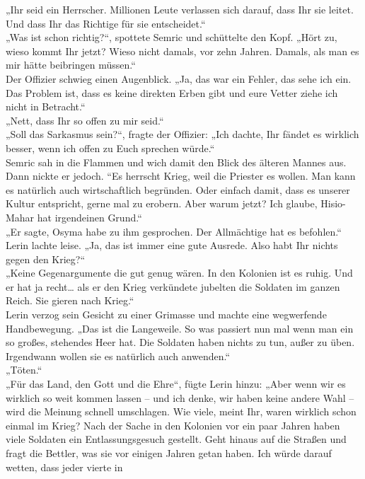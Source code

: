 „Ihr seid ein Herrscher. Millionen Leute verlassen sich darauf, dass Ihr sie leitet. Und dass Ihr 
das Richtige für sie entscheidet.“\\
„Was ist schon richtig?“, spottete Semric und schüttelte den Kopf. „Hört zu, wieso kommt Ihr jetzt? 
Wieso nicht damals, vor zehn Jahren. Damals, als man es mir hätte beibringen müssen.“\\
Der Offizier schwieg einen Augenblick. „Ja, das war ein Fehler, das sehe ich ein. Das Problem ist, 
dass es keine direkten Erben gibt und eure Vetter ziehe ich nicht in Betracht.“\\
„Nett, dass Ihr so offen zu mir seid.“\\
„Soll das Sarkasmus sein?“, fragte der Offizier: „Ich dachte, Ihr fändet es wirklich besser, wenn 
ich offen zu Euch sprechen würde.“\\
Semric sah in die Flammen und wich damit den Blick des älteren Mannes aus. Dann nickte er jedoch. 
``Es herrscht Krieg, weil die Priester es wollen. Man kann es natürlich auch wirtschaftlich 
begründen. Oder einfach damit, dass es unserer Kultur entspricht, gerne mal zu erobern. Aber warum 
jetzt? Ich glaube, Hisio-Mahar hat irgendeinen Grund.“\\
„Er sagte, Osyma habe zu ihm gesprochen. Der Allmächtige hat es befohlen.“\\
Lerin lachte leise. „Ja, das ist immer eine gute Ausrede. Also habt Ihr nichts gegen den Krieg?“\\
„Keine Gegenargumente die gut genug wären. In den Kolonien ist es ruhig. Und er hat ja recht… als er 
den Krieg verkündete jubelten die Soldaten im ganzen Reich. Sie gieren nach Krieg.“\\
Lerin verzog sein Gesicht zu einer Grimasse und machte eine wegwerfende Handbewegung. „Das ist die 
Langeweile. So was passiert nun mal wenn man ein so großes, stehendes Heer hat. Die Soldaten haben 
nichts zu tun, außer zu üben. Irgendwann wollen sie es natürlich auch anwenden.“\\
„Töten.“\\
„Für das Land, den Gott und die Ehre“, fügte Lerin hinzu: „Aber wenn wir es wirklich so weit kommen 
lassen – und ich denke, wir haben keine andere Wahl – wird die Meinung schnell umschlagen. Wie 
viele, meint Ihr, waren wirklich schon einmal im Krieg? Nach der Sache in den Kolonien vor ein paar 
Jahren haben viele Soldaten ein Entlassungsgesuch gestellt. Geht hinaus auf die Straßen und fragt 
die Bettler, was sie vor einigen Jahren getan haben. Ich würde darauf wetten, dass jeder vierte in 
